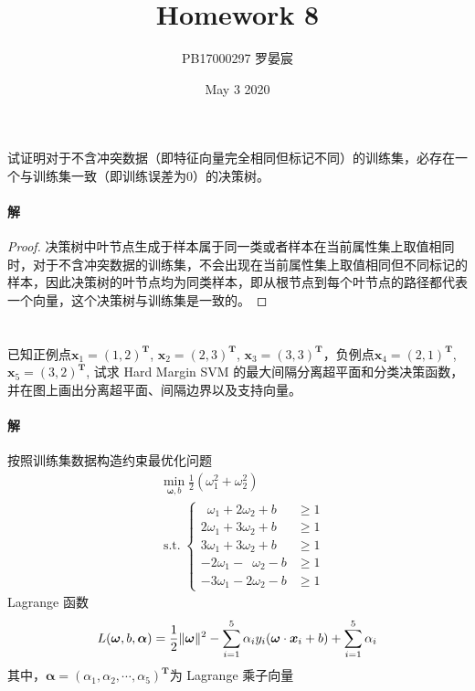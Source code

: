 \documentclass{article}
\title{Homework 8}
\author{PB17000297 罗晏宸}
\date{May 3 2020}
\begin{document}
\maketitle

\section{}
试证明对于不含冲突数据（即特征向量完全相同但标记不同）的训练集，必存在一个与训练集一致（即训练误差为0）的决策树。

\paragraph{解}
\begin{proof}
    决策树中叶节点生成于样本属于同一类或者样本在当前属性集上取值相同时，对于不含冲突数据的训练集，不会出现在当前属性集上取值相同但不同标记的样本，因此决策树的叶节点均为同类样本，即从根节点到每个叶节点的路径都代表一个向量，这个决策树与训练集是一致的。
\end{proof}

\section{}
已知正例点$\boldsymbol{x}_1 = (1, 2)^\mathbf{T}$, $\boldsymbol{x}_2 = (2, 3)^\mathbf{T}$, $\boldsymbol{x}_3 = (3, 3)^\mathbf{T}$，负例点$\boldsymbol{x}_4 = (2, 1)^\mathbf{T}$, $\boldsymbol{x}_5 = (3, 2)^\mathbf{T}$, 试求 Hard Margin SVM 的最大间隔分离超平面和分类决策函数，并在图上画出分离超平面、间隔边界以及支持向量。

\paragraph{解}
按照训练集数据构造约束最优化问题
\begin{align*}
     & \min_{\boldsymbol{\omega},b}{\frac{1}{2}(\omega_1^2 + \omega_2^2)} \label{1.1} \tag{1.1} \\
     & \operatorname{s.t.} \left\{
    \begin{aligned}
        \phantom{1}\omega_1 + 2\omega_2 + b  & \geqslant 1 \\
        2\omega_1 + 3\omega_2 + b            & \geqslant 1 \\
        3\omega_1 + 3\omega_2 + b            & \geqslant 1 \\
        -2\omega_1 - \phantom{1}\omega_2 - b & \geqslant 1 \\
        -3\omega_1 - 2\omega_2 - b           & \geqslant 1
    \end{aligned}
    \label{1.2} \tag{1.2}
    \right.
\end{align*}
Lagrange 函数
\begin{align*}
    L(\boldsymbol{\omega}, b, \boldsymbol{\alpha}) = \frac{1}{2}\Arrowvert\boldsymbol{\omega} \Arrowvert^2 - \sum_{i = 1}^5{\alpha_i y_i (\boldsymbol{\omega} \cdot \boldsymbol{x}_i + b)} + \sum_{i = 1}^5{\alpha_i}
\end{align*}
其中，$\boldsymbol{\alpha} = (\alpha_1,\alpha_2,\cdots,\alpha_5)^\mathbf{T}$为 Lagrange 乘子向量
\end{document}
